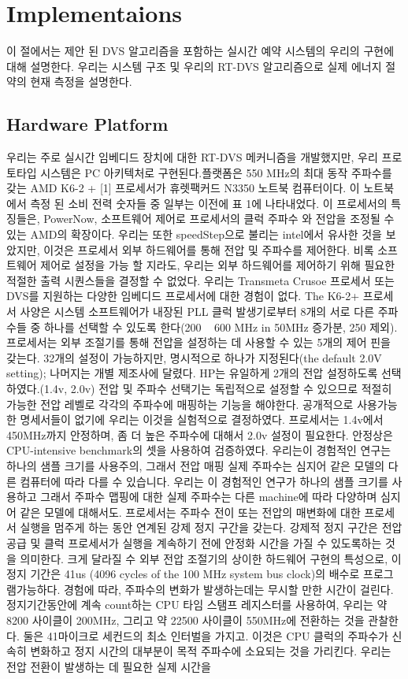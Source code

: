 \documentclass[11pt
  , a4paper
  , article
  , oneside
]{memoir}
\begin{document}
\chapter{Implementaions}
이 절에서는 제안 된 DVS 알고리즘을 포함하는 실시간 예약 시스템의 우리의 구현에 대해 설명한다. 우리는 시스템 구조 및 우리의 RT-DVS 알고리즘으로 실제 에너지 절약의 현재 측정을 설명한다.
\section{Hardware Platform}
우리는 주로 실시간 임베디드 장치에 대한 RT-DVS 메커니즘을 개발했지만, 우리 프로토타입 시스템은 PC 아키텍처로 구현된다.플랫폼은 550 MHz의 최대 동작 주파수를 갖는 AMD K6-2 + [1] 프로세서가 휴렛팩커드 N3350 노트북 컴퓨터이다. 이 노트북에서 측정 된 소비 전력 숫자들 중 일부는 이전에 표 1에 나타내었다. 이 프로세서의 특징들은, PowerNow, 소프트웨어 제어로 프로세서의 클럭 주파수 와 전압을 조정될 수 있는 AMD의 확장이다. 우리는 또한 speedStep으로 불리는 intel에서 유사한 것을 보았지만, 이것은 프로세서 외부 하드웨어를 통해 전압 및 주파수를 제어한다. 비록 소프트웨어 제어로 설정을 가능 할 지라도, 우리는 외부 하드웨어를 제어하기 위해 필요한 적절한 출력 시퀀스들을 결정할 수 없었다. 우리는  Transmeta Crusoe 프로세서 또는 DVS를 지원하는 다양한 임베디드 프로세서에 대한 경험이 없다. The K6-2+ 프로세서 사양은 시스템 소프트웨어가 내장된 PLL 클럭 발생기로부터 8개의 서로 다른 주파수들 중 하나를 선택할 수 있도록 한다(200 ~ 600 MHz in 50MHz 증가분, 250 제외). 프로세서는 외부 조절기를 통해 전압을 설정하는 데 사용할 수 있는 5개의 제어 핀을 갖는다. 32개의 설정이 가능하지만, 명시적으로 하나가 지정된다(the default 2.0V setting); 나머지는 개별 제조사에 달렸다. HP는 유일하게 2개의 전압 설정하도록 선택하였다.(1.4v, 2.0v) 전압 및 주파수 선택기는 독립적으로 설정할 수 있으므로 적절히 가능한 전압 레벨로 각각의 주파수에 매핑하는 기능을 해야한다. 공개적으로 사용가능한 명세서들이 없기에 우리는 이것을 실험적으로 결정하였다. 프로세서는 1.4v에서 450MHz까지 안정하며, 좀 더 높은 주파수에 대해서 2.0v 설정이 필요한다. 안정상은 CPU-intensive benchmark의 셋을 사용하여 검증하였다. 우리는이 경험적인 연구는 하나의 샘플 크기를 사용주의, 그래서 전압 매핑 실제 주파수는 심지어 같은 모델의 다른 컴퓨터에 따라 다를 수 있습니다. 우리는 이 경험적인 연구가 하나의 샘플 크기를 사용하고 그래서 주파수 맵핑에 대한 실제 주파수는 다른 machine에 따라 다양하며 심지어 같은 모델에 대해서도. 프로세서는 주파수 전이 또는 전압의 매변화에 대한 프로세서 실행을 멈주게 하는 동안 연계된 강제 정지 구간을 갖는다. 강제적 정지 구간은 전압 공급 및 클럭 프로세서가 실행을 계속하기 전에 안정화 시간을 가질 수 있도록하는 것을 의미한다. 크게 달라질 수 외부 전압 조절기의 상이한 하드웨어 구현의 특성으로, 이 정지 기간은 41us (4096 cycles of the 100 MHz system bus clock)의 배수로 프로그램가능하다. 경험에 따라, 주파수의 변화가 발생하는데는 무시할 만한 시간이 걸린다. 정지기간동안에 계속 count하는 CPU 타임 스탬프 레지스터를 사용하여, 우리는 약 8200 사이클이 200MHz, 그리고 약 22500 사이클이 550MHz에 전환하는 것을 관찰한다. 둘은 41마이크로 세컨드의 최소 인터벌을 가지고. 이것은 CPU 클럭의 주파수가 신속히 변화하고 정지 시간의 대부분이 목적 주파수에 소요되는 것을 가리킨다. 우리는 전압 전환이 발생하는 데 필요한 실제 시간을 
\end{document}
